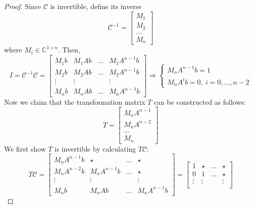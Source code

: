 \documentclass[
]{book}
\theoremstyle{definition}
\theoremstyle{definition}
\theoremstyle{definition}
\theoremstyle{definition}
\theoremstyle{remark}
\begin{document}
\begin{proof}
Since \(\mathcal{C}\) is invertible, define its inverse
\begin{equation*}
   \mathcal{C}^{-1} = \begin{bmatrix}
      M_1 \\ M_2 \\ \dots \\ M_n
   \end{bmatrix}
\end{equation*}
where \(M_i \in \mathbb{C}^{1 \times n}\). Then,
\begin{equation*}
   I = \mathcal{C}^{-1} \mathcal{C} = \begin{bmatrix}
      M_1 b & M_1 Ab & \dots & M_1 A^{n-1}b \\
      M_2 b & M_2 Ab & \dots & M_2 A^{n-1}b \\
      \vdots & \vdots &  & \vdots \\
      M_n b & M_n Ab & \dots & M_n A^{n-1}b
   \end{bmatrix} \Longrightarrow \begin{cases}
      M_n A^{n-1}b = 1 \\
      M_n A^ib = 0, \ i = 0,\dots, n-2
   \end{cases}
\end{equation*}
Now we claim that the transformation matrix \(T\) can be constructed as follows:
\begin{equation*}
   T = \begin{bmatrix}
      M_n A^{n-1} \\ M_n A^{n-2} \\ \dots \\ M_n
   \end{bmatrix}
\end{equation*}
We first show \(T\) is invertible by calculating \(T \mathcal{C}\):
\begin{equation*}
   T \mathcal{C} = \begin{bmatrix}
      M_n A^{n-1}b & \star & \dots & \star \\
      M_n A^{n-2}b & M_n A^{n-1}b & \dots & \star \\
      \vdots & \vdots &  & \vdots \\
      M_n b & M_n Ab & \dots & M_n A^{n-1}b
   \end{bmatrix} = \begin{bmatrix}
      1 & \star & \dots & \star \\
      0 & 1 & \dots & \star \\
      \vdots & \vdots &  & \vdots \\

\end{bmatrix}
\end{equation*}
\end{proof}
\end{document}
